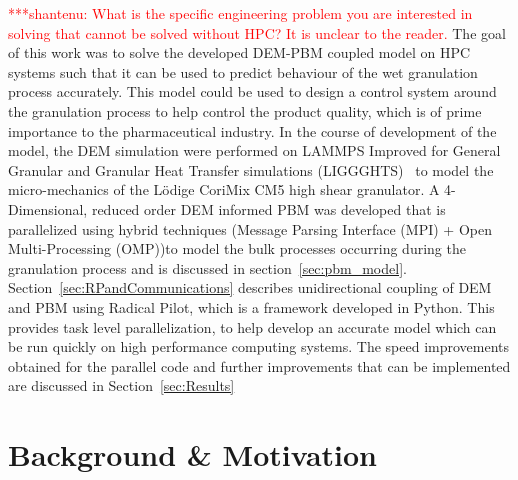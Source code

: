 \documentclass[preprint,11pt,authoryear]{elsarticle}
\newcommand{\jhanote}[1]{ {\textcolor{red} { ***shantenu: #1 }}}
\newcommand{\jhanote}[1]{}
\begin{document}
\jhanote{What is the specific engineering problem you are interested in
solving that cannot be solved without HPC? It is unclear to the reader.} 
The goal of this work was to solve the developed DEM-PBM coupled model on HPC 
systems such that it can be used to predict behaviour of the wet granulation 
process accurately. This model could be used to design a control system 
around the granulation process to help control the product quality, which is of 
prime importance to the pharmaceutical industry. In the course of
development of the model, the DEM simulation were performed on LAMMPS Improved
for General Granular and Granular Heat Transfer simulations
(LIGGGHTS)~\citep{Kloss2012} to model the micro-mechanics of the L\"{o}dige
CoriMix CM5 high shear granulator. A 4-Dimensional, reduced order DEM informed
PBM was developed that is parallelized using hybrid techniques (Message
Parsing Interface (MPI) + Open Multi-Processing (OMP))to model the bulk
processes occurring during the granulation process and is discussed in
section~\ref{sec:pbm_model}. Section~\ref{sec:RPandCommunications} describes
unidirectional coupling of DEM and PBM using Radical Pilot, which is a
framework developed in Python. This provides task level parallelization, to
help develop an accurate model which can be run quickly on high performance
computing systems. The speed improvements obtained for the parallel code and
further improvements that can be implemented are discussed in
Section~\ref{sec:Results}


\section{Background \& Motivation}
\end{document}
